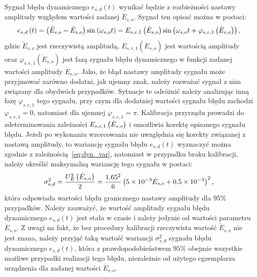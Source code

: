 Sygnał błędu dynamicznego $e_{s,d}(t)$ wynikać będzie z rozbieżności nastawy amplitudy względem wartości zadanej $\dot{E}_{s,o}$. Sygnał ten opisać można w postaci:
\begin{equation}
e_{s,d} \left(t\right) = \left(\tilde{E}_{s,o} - \dot{E}_{s,o}\right) \sin \left(\omega_{s,o} t\right) = E_{s,e,1} \left(\dot{E}_{s,o}\right) \sin \left(\omega_{s,o} t + \varphi_{s,e,1} \left(\dot{E}_{s,o}\right)\right) \label{eq:pom_gen_err_dyn_mono},
\end{equation}
gdzie $\tilde{E}_{s,o}$ jest rzeczywistą amplitudą, $E_{s,e,1}(\dot{E}_{s,o})$ jest wartością amplitudy oraz $\varphi_{s,e,1}(\dot{E}_{s,o})$ jest fazą sygnału błędu dynamicznego w funkcji zadanej wartości amplitudy $\dot{E}_{s,o}$. Jako, że błąd nastawy amplitudy sygnału może przyjmować zarówno dodatni, jak ujemny znak, należy rozważać sygnał z nim związany dla obydwóch przypadków. Sytuacje te odróżnić należy analizując inną fazę $\varphi_{s,e,1}$ tego sygnału, przy czym dla dodatniej wartości sygnału błędu zachodzi $\varphi_{s,e,1} = 0$, natomiast dla ujemnej $\varphi_{s,e,1} = \pi$. Kalibracja przyrządu prowadzi do zdeterminowania zależności $E_{s,e,1} \left(\dot{E}_{s,o}\right)$ i umożliwia korektę opisanego sygnału błędu. Jeżeli po wykonaniu wzorcowania nie uwzględnia się korekty związanej z nastawą amplitudy, to wariancję sygnału błędu $e_{s,d}(t)$ wyznaczyć można zgodnie z zależnością~\eqref{eq:dyn_var}, natomiast w przypadku braku kalibracji, należy określić maksymalną wariancję tego sygnału w postaci:
\begin{equation}
\sigma_{s,d}^{2} = \frac{U_{E}^{2} \left(\dot{E}_{s,o}\right)}{2} = \frac{1.65^{2}}{6} \left(\num{5e-3} \dot{E}_{s,o} + \num{0.5e-3}\right)^{2} \label{eq:pom_gen_var_dyn},
\end{equation}
która odpowiada wartości błędu granicznego nastawy amplitudy dla $95\%$ przypadków. Należy zauważyć, że wartość amplitudy sygnału błędu dynamicznego $e_{s,d}(t)$ jest stała w czasie i zależy jedynie od wartości parametru $\dot{E}_{s,o}$. Z uwagi na fakt, że bez procedury kalibracji rzeczywista wartość $\tilde{E}_{s,o}$ nie jest znana, należy przyjąć taką wartość wariancji $\sigma_{s,d}^{2}$ sygnału błędu dynamicznego $e_{s,d}(t)$, która z prawdopodobieństwem $95\%$ obejmie wszystkie możliwe przypadki realizacji tego błędu, niezależnie od użytego egzemplarza urządzenia dla zadanej wartości $\dot{E}_{s,o}$.

